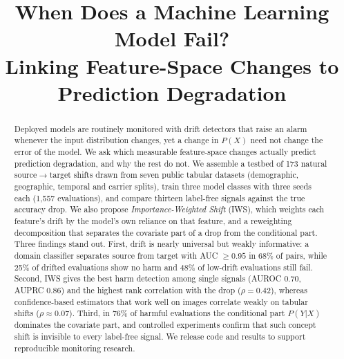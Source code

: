 \documentclass[conference]{IEEEtran}
\theoremstyle{plainhead}
\newcommand{\iws}{\textsc{IWS}}
\begin{document}
\title{When Does a Machine Learning Model Fail?\\
Linking Feature-Space Changes to Prediction Degradation}

\author{
\and
{}
}

\maketitle

\begin{abstract}
Deployed models are routinely monitored with drift detectors that raise an alarm whenever the input distribution changes, yet a change in $P(X)$ need not change the error of the model. We ask which measurable feature-space changes actually predict prediction degradation, and why the rest do not. We assemble a testbed of 173 natural source$\to$target shifts drawn from seven public tabular datasets (demographic, geographic, temporal and carrier splits), train three model classes with three seeds each (1{,}557 evaluations), and compare thirteen label-free signals against the true accuracy drop. We also propose \emph{Importance-Weighted Shift} (\iws{}), which weights each feature's drift by the model's own reliance on that feature, and a reweighting decomposition that separates the covariate part of a drop from the conditional part. Three findings stand out. First, drift is nearly universal but weakly informative: a domain classifier separates source from target with AUC $\ge 0.95$ in 68\% of pairs, while 25\% of drifted evaluations show no harm and 48\% of low-drift evaluations still fail. Second, \iws{} gives the best harm detection among single signals (AUROC 0.70, AUPRC 0.86) and the highest rank correlation with the drop ($\rho=0.42$), whereas confidence-based estimators that work well on images correlate weakly on tabular shifts ($\rho \approx 0.07$). Third, in 76\% of harmful evaluations the conditional part $P(Y|X)$ dominates the covariate part, and controlled experiments confirm that such concept shift is invisible to every label-free signal. We release code and results to support reproducible monitoring research.
\end{abstract}
\end{document}
